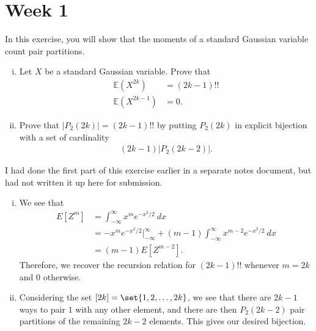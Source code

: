 \documentclass[10pt]{mypackage}
\begin{document}
\RaggedRight
\section{Week 1}%

\begin{problem}[Exercise 1.17]
  In this exercise, you will show that the moments of a standard Gaussian variable count pair partitions.
  \begin{enumerate}[(i)]
    \item Let $X$ be a standard Gaussian variable. Prove that
      \begin{align*}
        \mathbb{E}\left( X^{2k} \right) &= \left( 2k-1 \right)!!\\
        \mathbb{E}\left( X^{2k-1} \right) &= 0.
      \end{align*}
    \item Prove that $\left\vert P_2(2k) \right\vert = \left( 2k-1 \right)!!$ by putting $P_2\left( 2k \right)$ in explicit bijection with a set of cardinality 
      \begin{align*}
        \left( 2k-1 \right)\left\vert P_2\left( 2k-2 \right) \right\vert.
      \end{align*}
  \end{enumerate}
\end{problem}
\begin{remark}
  I had done the first part of this exercise earlier in a separate notes document, but had not written it up here for submission.
\end{remark}
\begin{solution}\hfill
  \begin{enumerate}[(i)]
    \item We see that
        \begin{align*}
          E\left[ Z^{m} \right] &= \int_{-\infty}^{\infty} x^{m}e^{-x^2/2}\:dx\\
                                &= -x^{m}e^{-x^2/2}\bigr\vert_{-\infty}^{\infty} + \left( m-1 \right) \int_{-\infty}^{\infty} x^{m-2}e^{-x^2/2}\:dx\\
                                &= \left( m-1 \right)E\left[ Z^{m-2} \right].
        \end{align*}
        Therefore, we recover the recursion relation for $\left( 2k-1 \right)!!$ whenever $m = 2k$ and $0$ otherwise.
      \item Considering the set $\left[ 2k \right] = \set{1,2,\dots,2k}$, we see that there are $2k-1$ ways to pair $1$ with any other element, and there are then $P_2\left( 2k-2 \right)$ pair partitions of the remaining $2k-2$ elements. This gives our desired bijection.
  \end{enumerate}
\end{solution}
\pagebreak
\end{document}
